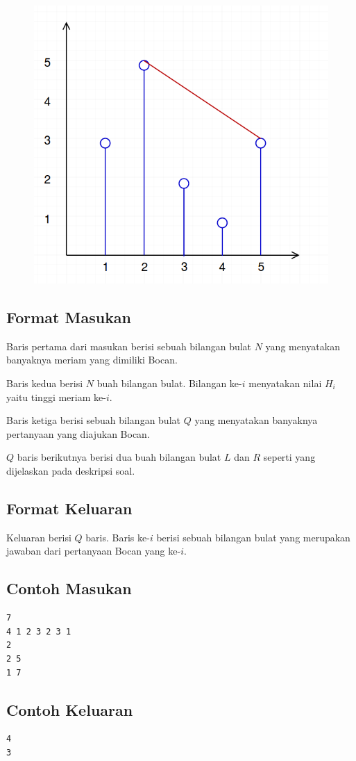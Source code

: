 \documentclass{article}
\begin{document}
\begin{figure}[h!]
	\centering
	\includegraphics[width=0.2\linewidth]{meriam2.png}
\end{figure}

\subsection*{Format Masukan}

\par\noindent Baris pertama dari masukan berisi sebuah bilangan bulat $N$ yang menyatakan banyaknya meriam yang dimiliki Bocan.
\par\noindent Baris kedua berisi $N$ buah bilangan bulat. Bilangan ke-$i$ menyatakan nilai $H_i$ yaitu tinggi meriam ke-$i$.
\par\noindent Baris ketiga berisi sebuah bilangan bulat $Q$ yang menyatakan banyaknya pertanyaan yang diajukan Bocan.
\par\noindent $Q$ baris berikutnya berisi dua buah bilangan bulat $L$ dan $R$ seperti yang dijelaskan pada deskripsi soal.

\subsection*{Format Keluaran}

\par\noindent Keluaran berisi $Q$ baris. Baris ke-$i$ berisi sebuah bilangan bulat yang merupakan jawaban dari pertanyaan Bocan yang ke-$i$.

\subsection*{Contoh Masukan}

\begin{lstlisting}
7
4 1 2 3 2 3 1
2
2 5
1 7
\end{lstlisting}

\subsection*{Contoh Keluaran}

\begin{lstlisting}
4
3
\end{lstlisting}
\end{document}
